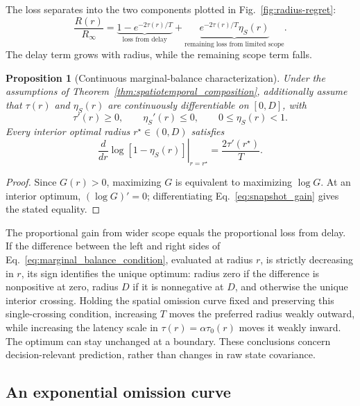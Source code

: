 \documentclass[11pt]{article}
\newtheorem{proposition}{Proposition}
\begin{document}
The loss separates into the two components plotted in
Fig.~\ref{fig:radius-regret}:
\begin{equation}
\frac{R(r)}{R_\infty}
=\underbrace{1-e^{-2\tau(r)/T}}_{\text{loss from delay}}
+\underbrace{e^{-2\tau(r)/T}\eta_S(r)}_{\text{remaining loss from limited scope}}.
\label{eq:R_decomposition}
\end{equation}
The delay term grows with radius, while the remaining scope term falls.

\begin{proposition}[Continuous marginal-balance characterization]
\label{thm:marginal_balance}
Under the assumptions of
Theorem~\ref{thm:spatiotemporal_composition}, additionally assume that
$\tau(r)$ and $\eta_S(r)$ are continuously differentiable on $[0,D]$, with
\[
    \tau'(r)\ge0,\qquad \eta_S'(r)\le0,\qquad 0\le\eta_S(r)<1.
\]
Every interior optimal radius $r^\star\in(0,D)$ satisfies
\begin{equation}
\left.\frac{d}{dr}\log[1-\eta_S(r)]\right|_{r=r^\star}
=\frac{2\tau'(r^\star)}{T}.
\label{eq:marginal_balance_condition}
\end{equation}
\end{proposition}

\begin{proof}
Since $G(r)>0$, maximizing $G$ is equivalent to maximizing $\log G$.
At an interior optimum, $(\log G)'=0$; differentiating
Eq.~\eqref{eq:snapshot_gain} gives the stated equality.
\end{proof}

The proportional gain from wider scope equals the proportional loss from
delay. If the difference between the left and right sides of
Eq.~\eqref{eq:marginal_balance_condition}, evaluated at radius $r$, is
strictly decreasing in $r$, its sign identifies the unique optimum:
radius zero if the difference is nonpositive at zero, radius $D$ if it is
nonnegative at $D$, and otherwise the unique interior crossing.
Holding the spatial omission curve fixed and preserving this single-crossing
condition, increasing $T$ moves the preferred radius weakly outward, while
increasing the latency scale in $\tau(r)=\alpha\tau_0(r)$ moves it weakly inward.
The optimum can stay unchanged at a boundary. These conclusions concern
decision-relevant prediction, rather than changes in raw state covariance.

\subsection{An exponential omission curve}
\end{document}

